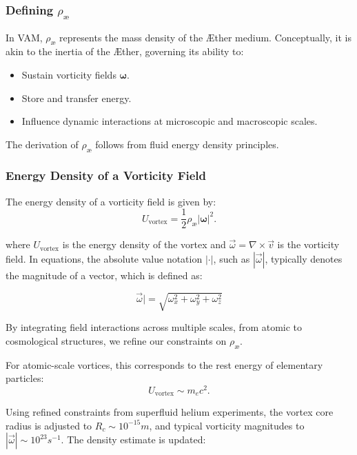 \documentclass[a4paper,10pt]{article}
\begin{document}
\subsubsection*{Defining $ \rho_\text{\ae} $}
In VAM, $ \rho_\text{\ae} $ represents the mass density of the Æther medium. Conceptually, it is akin to the inertia of the Æther, governing its ability to:

\begin{itemize}
    \item Sustain vorticity fields $ \mathbf{\omega} $.
    \item Store and transfer energy.
    \item Influence dynamic interactions at microscopic and macroscopic scales.
\end{itemize}
The derivation of $ \rho_\text{\ae} $ follows from fluid energy density principles.

\subsubsection*{Energy Density of a Vorticity Field}
The energy density of a vorticity field is given by:
\begin{equation*}
    U_\text{vortex} = \frac{1}{2} \rho_\text{\ae} |\mathbf{\omega}|^2.
\end{equation*}


where $U_\text{vortex}$ is the energy density of the vortex and $\vec{\omega} = \nabla \times \vec{v}$ is the vorticity field. In equations, the absolute value notation $| \cdot |$, such as $|\vec{\omega}|$, typically denotes the magnitude of a vector, which is defined as:

\begin{equation*}
    \vec{\omega}| = \sqrt{\omega_x^2 + \omega_y^2 + \omega_z^2}
\end{equation*}

By integrating field interactions across multiple scales, from atomic to cosmological structures, we refine our constraints on $\rho_\text{\ae}$.


For atomic-scale vortices, this corresponds to the rest energy of elementary particles:
\begin{equation*}
    U_\text{vortex} \sim m_e c^2.
\end{equation*}

Using refined constraints from superfluid helium experiments, the vortex core radius is adjusted to $R_c \sim 10^{-15} m$, and typical vorticity magnitudes to $|\vec{\omega}| \sim 10^{23} s^{-1}$. The density estimate is updated:
\end{document}
